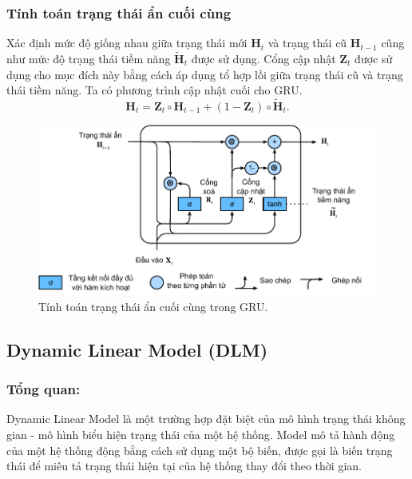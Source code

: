 \documentclass[conference]{IEEEtran}
\begin{document}
\subsubsection{Tính toán trạng thái ẩn cuối cùng}
Xác định mức độ giống nhau giữa trạng thái mới \(\mathbf{H}_t \) và trạng thái cũ \(\mathbf{H}_{t-1}\) cũng như mức độ trạng thái tiềm năng \(\widetilde{\mathbf{H}}_t\) được sử dụng. Cổng cập nhật \(\mathbf{Z}_t\) được sử dụng cho mục đích này bằng cách áp dụng tổ hợp lồi giữa trạng thái cũ và trạng thái tiềm năng. Ta có phương
trình cập nhật cuối cho GRU.
\[
    \mathbf{H}_t = \mathbf{Z}_t \circ \mathbf{H}_{t-1} + (1 - \mathbf{Z}_t) \circ \tilde{\mathbf{H}}_t.
\]

\begin{figure}[H]
    \centering
    \begin{minipage}{0.43\textwidth}
        \centering
        \includegraphics[width=1\textwidth]{bibliography/figure/GRU/gru_3.pdf}
        \caption{Tính toán trạng thái ẩn cuối cùng trong GRU.}
        \label{fig:gru_up}
    \end{minipage}

\end{figure}


\subsection{Dynamic Linear Model (DLM)}
\subsubsection{Tổng quan:}
Dynamic Linear Model là một trường hợp đặt biệt của mô hình trạng thái không gian - mô hình biểu hiện trạng thái của một hệ thống. Model mô tả hành động của một hệ thống động bằng cách sử dụng một bộ biến, được gọi là biến trạng thái để miêu tả trạng thái hiện tại của hệ thống thay đổi theo thời gian.
\end{document}
